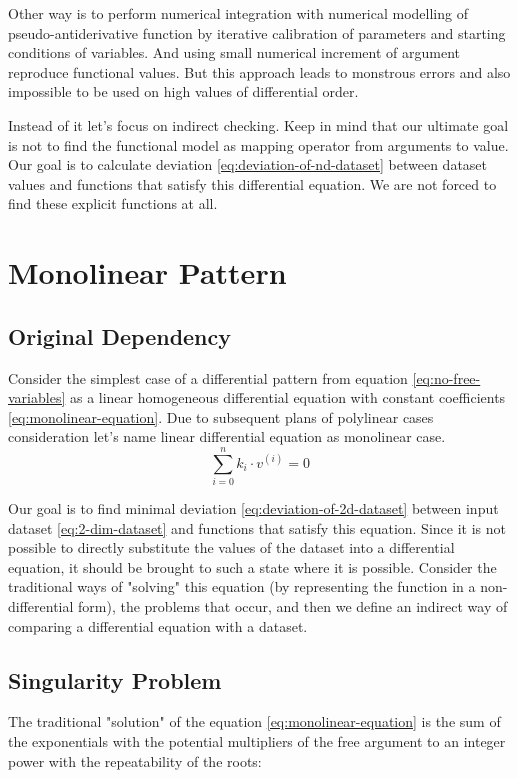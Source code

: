 \documentclass[a4paper, 11pt, oneside]{book}
\begin{document}
Other way is to perform numerical integration with numerical modelling of pseudo-antiderivative function by iterative calibration of parameters and starting conditions of variables. And using small numerical increment of argument reproduce functional values. But this approach leads to monstrous errors and also impossible to be used on high values of differential order.

Instead of it let's focus on indirect checking. Keep in mind that our ultimate goal is not to find the functional model as mapping operator from arguments to value. Our goal is to calculate deviation \ref{eq:deviation-of-nd-dataset} between dataset values and functions that satisfy this differential equation. We are not forced to find these explicit functions at all.

\section{Monolinear Pattern}
\subsection{Original Dependency}
Consider the simplest case of a differential pattern from equation \ref{eq:no-free-variables} as a linear homogeneous differential equation with constant coefficients \ref{eq:monolinear-equation}. Due to subsequent plans of polylinear cases consideration let's name linear differential equation as monolinear case.
\begin{equation}\label{eq:monolinear-equation}
  \sum_{i = 0}^n k_i \cdot v^{(i)} = 0
\end{equation}

Our goal is to find minimal deviation \ref{eq:deviation-of-2d-dataset} between input dataset \ref{eq:2-dim-dataset} and functions that satisfy this equation. Since it is not possible to directly substitute the values of the dataset into a differential equation, it should be brought to such a state where it is possible. Consider the traditional ways of "solving" this equation (by representing the function in a non-differential form), the problems that occur, and then we define an indirect way of comparing a differential equation with a dataset.

\subsection{Singularity Problem}
The traditional "solution" of the equation \ref{eq:monolinear-equation} is the sum of the exponentials with the potential multipliers of the free argument to an integer power with the repeatability of the roots:
\end{document}
